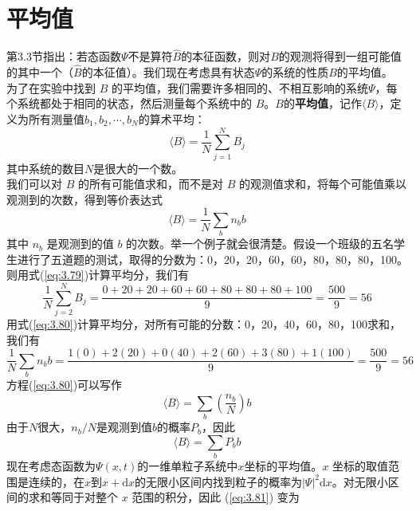 \section{平均值}
	第3.3节指出：若态函数$\Psi$不是算符$\hat{B}$的本征函数，则对$B$的观测将得到一组可能值的其中一个（$\hat{B}$的本征值）。我们现在考虑具有状态$\Psi$的系统的性质$B$的平均值。\\
	\indent 为了在实验中找到 $B$ 的平均值，我们需要许多相同的、不相互影响的系统$\Psi$，每个系统都处于相同的状态，然后测量每个系统中的 $B$。$B$的\textbf{平均值}，记作$\langle B \rangle$，定义为所有测量值$b_1,b_2,\cdots,b_N$的算术平均：
	\begin{equation}
		\langle B \rangle = \frac{1}{N}\sum_{j=1}^{N}B_j
		\label{eq:3.79}
	\end{equation}
	其中系统的数目$N$是很大的一个数。\\
	\indent 我们可以对 $B$ 的所有可能值求和，而不是对 $B$ 的观测值求和，将每个可能值乘以观测到的次数，得到等价表达式
	\begin{equation}
		\langle B \rangle = \frac{1}{N}\sum_{b}n_bb
		\label{eq:3.80}
	\end{equation}
	其中 $n_b$ 是观测到的值 $b$ 的次数。举一个例子就会很清楚。假设一个班级的五名学生进行了五道题的测试，取得的分数为：0，20，20，60，60，80，80，80，100。则用式(\ref{eq:3.79})计算平均分，我们有
	\begin{equation*}
		\frac{1}{N}\sum_{j=2}^{N}B_j = \frac{0+20+20+60+60+80+80+80+100}{9} = \frac{500}{9} = 56
	\end{equation*}
	用式(\ref{eq:3.80})计算平均分，对所有可能的分数：0，20，40，60，80，100求和，我们有
	\begin{equation*}
		\frac{1}{N}\sum_{b}n_bb = \frac{1\left(0\right)+2\left(20\right)+0\left(40\right)+2\left(60\right)+3\left(80\right)+1\left(100\right)}{9} = \frac{500}{9} = 56
	\end{equation*}
	\indent 方程(\ref{eq:3.80})可以写作
	\begin{equation*}
		\langle B \rangle = \sum_{b}\left(\frac{n_b}{N}\right)b
	\end{equation*}
	由于$N$很大，$n_b/N$是观测到值$b$的概率$P_b$，因此
	\begin{equation}
		\langle B \rangle = \sum_{b}P_bb
		\label{eq:3.81}
	\end{equation}
	\indent 现在考虑态函数为$\Psi\left(x,t\right)$的一维单粒子系统中$x$坐标的平均值。$x$ 坐标的取值范围是连续的，在$x$到$x+\mathrm{d}x$的无限小区间内找到粒子的概率为$\left|\Psi\right|^2\mathrm{d}x$。对无限小区间的求和等同于对整个 $x$ 范围的积分，因此 (\ref{eq:3.81}) 变为
